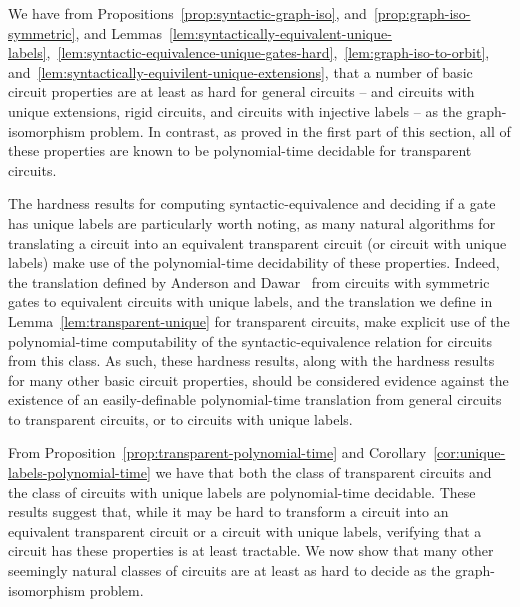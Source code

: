 \documentclass[../paper.tex]{subfiles}
\begin{document}
We have from Propositions~\ref{prop:syntactic-graph-iso},
and~\ref{prop:graph-iso-symmetric}, and
Lemmas~\ref{lem:syntactically-equivalent-unique-labels},~\ref{lem:syntactic-equivalence-unique-gates-hard},~\ref{lem:graph-iso-to-orbit},
and~\ref{lem:syntactically-equivilent-unique-extensions}, that a number of basic
circuit properties are at least as hard for general circuits -- and circuits
with unique extensions, rigid circuits, and circuits with injective labels -- as
the graph-isomorphism problem. In contrast, as proved in the first part of this
section, all of these properties are known to be polynomial-time decidable for
transparent circuits.

The hardness results for computing syntactic-equivalence and deciding if a gate
has unique labels are particularly worth noting, as many natural algorithms for
translating a circuit into an equivalent transparent circuit (or circuit with
unique labels) make use of the polynomial-time decidability of these properties.
Indeed, the translation defined by Anderson and Dawar~\cite{AndersonD17} from
circuits with symmetric gates to equivalent circuits with unique labels, and the
translation we define in Lemma~\ref{lem:transparent-unique} for transparent
circuits, make explicit use of the polynomial-time computability of the
syntactic-equivalence relation for circuits from this class. As such, these
hardness results, along with the hardness results for many other basic circuit
properties, should be considered evidence against the existence of an
easily-definable polynomial-time translation from general circuits to
transparent circuits, or to circuits with unique labels.





From Proposition~\ref{prop:transparent-polynomial-time} and
Corollary~\ref{cor:unique-labels-polynomial-time} we have that both the class of
transparent circuits and the class of circuits with unique labels are
polynomial-time decidable. These results suggest that, while it may be hard to
transform a circuit into an equivalent transparent circuit or a circuit with
unique labels, verifying that a circuit has these properties is at least
tractable. We now show that many other seemingly natural classes of circuits are
at least as hard to decide as the graph-isomorphism problem.
\end{document}
